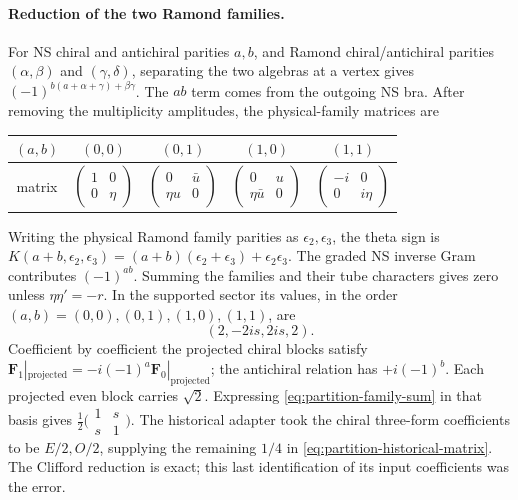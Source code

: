 \paragraph{Reduction of the two Ramond families.}
For NS chiral and antichiral parities $a,b$, and Ramond
chiral/antichiral parities $(\alpha,\beta)$ and
$(\gamma,\delta)$, separating the two algebras at a vertex gives
$(-1)^{b(a+\alpha+\gamma)+\beta\gamma}$. The $ab$ term comes
from the outgoing NS bra. After removing the multiplicity
amplitudes, the physical-family matrices are
\begin{center}
\begin{tabular}{ccccc}
\toprule
$(a,b)$ & $(0,0)$ & $(0,1)$ & $(1,0)$ & $(1,1)$\\
\midrule
matrix & $\begin{pmatrix}1&0\\0&\eta\end{pmatrix}$
& $\begin{pmatrix}0&\bar u\\\eta u&0\end{pmatrix}$
& $\begin{pmatrix}0&u\\\eta\bar u&0\end{pmatrix}$
& $\begin{pmatrix}-i&0\\0&i\eta\end{pmatrix}$\\
\bottomrule
\end{tabular}
\end{center}
Writing the physical Ramond family parities as
$\epsilon_2,\epsilon_3$, the theta sign is
$K(a+b,\epsilon_2,\epsilon_3)
=(a+b)(\epsilon_2+\epsilon_3)+\epsilon_2\epsilon_3$.
The graded NS inverse Gram contributes $(-1)^{ab}$.
Summing the families and their tube characters gives zero unless
$\eta\eta'=-r$. In the supported sector its values, in the order
$(a,b)=(0,0),(0,1),(1,0),(1,1)$, are
\begin{equation}
 (2,-2is,2is,2).
 \label{eq:partition-family-sum}
\end{equation}
Coefficient by coefficient the projected chiral blocks satisfy
$\mathbf F_1|_{\mathrm{projected}}
=-i(-1)^a\mathbf F_0|_{\mathrm{projected}}$;
the antichiral relation has $+i(-1)^b$.
Each projected even block carries $\sqrt2$. Expressing
\eqref{eq:partition-family-sum} in that basis gives
$\tfrac12\bigl(\begin{smallmatrix}1&s\\s&1\end{smallmatrix}\bigr)$.
The historical adapter took the chiral three-form coefficients to be
$E/2,O/2$, supplying the remaining $1/4$ in
\eqref{eq:partition-historical-matrix}. The Clifford reduction is exact;
this last identification of its input coefficients was the error.

